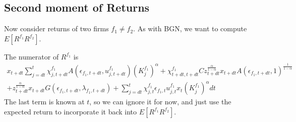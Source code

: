\subsection{Second moment of Returns}

Now consider returns of two firms $f_1 \neq f_2.$ As with BGN, we want to compute $E[R^{f_1} R^{f_2}].$

The numerator of $R^{f_1}$ is
\begin{multline*}
x_{t+dt} \sum_{ j = dt}^{t} \chi_{j, t+dt}^{f_1} A(\epsilon_{f_1,t+dt}, u_{j, t+dt}^{f_1})( K_j^{f_1})^{\alpha} + \chi_{t+dt, t+dt}^{f_1}C z_{t+dt}^{\frac{\alpha}{1 - \alpha}} x_{t+dt} A(\epsilon_{f_1, t+dt}, 1)^{\frac{1}{1 - \alpha}}\\
+ z_{t+dt}^{\frac{\alpha}{1 - \alpha}} x_{t+dt} G(\epsilon_{f_1,t+dt}, \lambda_{f_1,t+dt})+ \sum_{j = dt}^t\chi_{j, t}^{f_1} \epsilon_{f_1,t} u_{j,t}^{f_1} x_{t} (K_j^{f_1})^{\alpha} dt
\end{multline*}
The last term is known at $t$, so we can ignore it for now, and just use the expected return to incorporate it back into $E[R^{f_1} R^{f_2}].$

